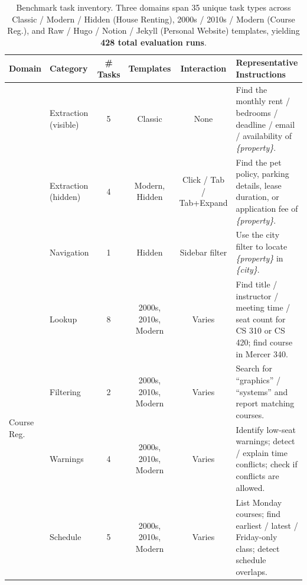\documentclass[10pt]{article}
\begin{document}
\begin{table}[ht]
\centering
\caption{%
  Benchmark task inventory. Three domains span 35 unique task types across
  Classic / Modern / Hidden (House Renting), 2000s / 2010s / Modern
  (Course Reg.), and Raw / Hugo / Notion / Jekyll (Personal Website) templates,
  yielding \textbf{428 total evaluation runs}.
}
\label{tab:task-inventory}
\renewcommand{\arraystretch}{1.22}
\setlength{\tabcolsep}{6pt}

\begin{tabularx}{\textwidth}{l l c c c X}
\toprule
\textbf{Domain} & \textbf{Category} & \textbf{\# Tasks} &
\textbf{Templates} & \textbf{Interaction} & \textbf{Representative Instructions} \\
\midrule

\rowcolor{lightgray}
\multirow{3}{*}{House Renting}
  & Extraction (visible)   & 5 & Classic              & None
  & Find the monthly rent / bedrooms / deadline / email / availability of \textit{\{property\}}. \\

  & Extraction (hidden)    & 4 & Modern, Hidden       & Click / Tab / Tab+Expand
  & Find the pet policy, parking details, lease duration, or application fee of \textit{\{property\}}. \\

\rowcolor{lightgray}
  & Navigation             & 1 & Hidden               & Sidebar filter
  & Use the city filter to locate \textit{\{property\}} in \textit{\{city\}}. \\

\midrule

\multirow{5}{*}{Course Reg.}
  & Lookup                 & 8 & 2000s, 2010s, Modern & Varies
  & Find title / instructor / meeting time / seat count for CS 310 or CS 420; find course in Mercer 340. \\

\rowcolor{lightgray}
  & Filtering              & 2 & 2000s, 2010s, Modern & Varies
  & Search for ``graphics'' / ``systems'' and report matching courses. \\

  & Warnings               & 4 & 2000s, 2010s, Modern & Varies
  & Identify low-seat warnings; detect / explain time conflicts; check if conflicts are allowed. \\

\rowcolor{lightgray}
  & Schedule               & 5 & 2000s, 2010s, Modern & Varies
  & List Monday courses; find earliest / latest / Friday-only class; detect schedule overlaps. \\


\end{tabularx}
\end{table}
\end{document}
